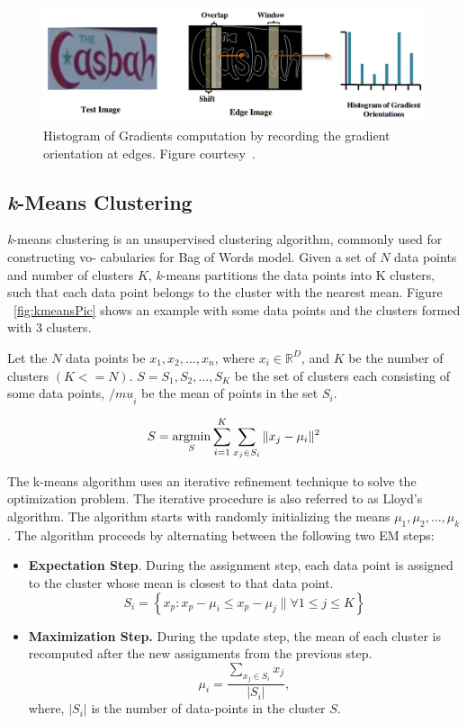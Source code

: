 \begin{figure}
\centering
\includegraphics[scale=0.4]{figures/hogPic.png}
\caption{Histogram of Gradients computation by recording the gradient orientation at edges. Figure courtesy~\cite{Vibhor13}.}
\label{fig:hogPic}
\end{figure}

\subsection{\textit{k}-Means Clustering}
\textit{k}-means clustering is an unsupervised clustering algorithm, commonly used for constructing vo-
cabularies for Bag of Words model. Given a set of $N$ data points and number of clusters $K$, \textit{k}-means partitions the data points into K clusters, such that each data point belongs to the cluster with the nearest
mean. Figure ~\ref{fig:kmeansPic} shows an example with some data points and the clusters formed with 3 clusters.

Let the $N$ data points be $x_1, x_2, \ldots , x_n$, where $x_i \in \mathbb{R}^D$, and $K$ be the number of clusters $(K <= N)$. $S=S_1, S_2,\ldots ,S_K$ be the set of clusters each consisting of some data points, ${/mu}_i$ be the mean of points in the set $S_i$.

\begin{equation}
S = \operatornamewithlimits{argmin}_S \sum_{i=1}^{K} \sum_{x_j \in S_i} {\|{x_j - \mu_i}}\|^2
\end{equation}

The k-means algorithm uses an iterative refinement technique to solve the optimization problem.
The iterative procedure is also referred to as Lloyd’s algorithm. The algorithm starts with randomly initializing the means $\mu_1, \mu_2, \ldots, \mu_k$ . The algorithm proceeds by alternating between the following two EM steps:

\begin{itemize}
\item \textbf{Expectation Step}. During the assignment step, each data point is assigned to the cluster whose
mean is closest to that data point.
\begin{equation}
S_i = \left\lbrace x_p: x_p - \mu_i \leq x_p - \mu_j \| \forall 1 \leq j \leq K \right\rbrace
\end{equation}

\item \textbf{Maximization Step.} During the update step, the mean of each cluster is recomputed after the new assignments from the previous step.
\begin{equation}
\mu_i = \frac{\sum_{x_j \in S_i} x_j}{|S_i|},
\end{equation}
where, $|S_i|$ is the number of data-points in the cluster $S$.
\end{itemize}

